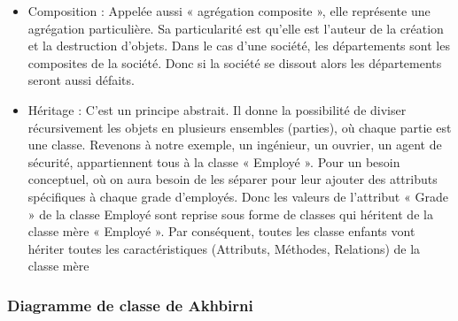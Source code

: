 \begin{itemize}
\begin{itemize}
    
    \item Composition : Appelée aussi « agrégation composite », elle représente une agrégation particulière. Sa particularité est qu’elle est l’auteur de la création et la destruction d’objets. Dans le cas d’une société, les départements sont les composites de la société. Donc si la société se dissout alors les départements seront aussi défaits.
    
    \item Héritage : C’est un principe abstrait. Il donne la possibilité de diviser récursivement les objets en plusieurs ensembles (parties), où chaque partie est une classe. Revenons à notre exemple, un ingénieur, un ouvrier, un agent de sécurité, appartiennent tous à la classe « Employé ». Pour un besoin conceptuel, où on aura besoin de les séparer pour leur ajouter des attributs spécifiques à chaque grade d’employés. Donc les valeurs de l’attribut « Grade » de la classe Employé sont reprise sous forme de classes qui héritent de la classe mère « Employé ». Par conséquent, toutes
    les classe enfants vont hériter toutes les caractéristiques (Attributs, Méthodes, Relations) de la classe mère

   \end{itemize}

\end{itemize}

\subsubsection{Diagramme de classe de Akhbirni}

